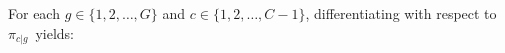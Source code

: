 For each $g \in \{1,2,\ldots,G\}$ and $c \in \{1,2,\ldots,C-1\}$, differentiating with respect to \,$\pi_{c \vert g}$\, yields:
